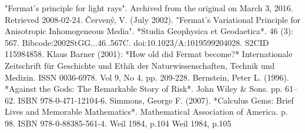 "Fermat's principle for light rays". Archived from the original on March 3, 2016. Retrieved 2008-02-24.  
Červený, V. (July 2002). "Fermat's Variational Principle for Anisotropic Inhomogeneous Media". *Studia Geophysica et Geodaetica*. 46 (3): 567. Bibcode:2002StGG...46..567C. doi:10.1023/A:1019599204028. S2CID 115984858.  
Klaus Barner (2001): *How old did Fermat become?* Internationale Zeitschrift für Geschichte und Ethik der Naturwissenschaften, Technik und Medizin. ISSN 0036-6978. Vol 9, No 4, pp. 209-228.  
Bernstein, Peter L. (1996). *Against the Gods: The Remarkable Story of Risk*. John Wiley & Sons. pp. 61–62. ISBN 978-0-471-12104-6.  
Simmons, George F. (2007). *Calculus Gems: Brief Lives and Memorable Mathematics*. Mathematical Association of America. p. 98. ISBN 978-0-88385-561-4.  
Weil 1984, p.104  
Weil 1984, p.105
